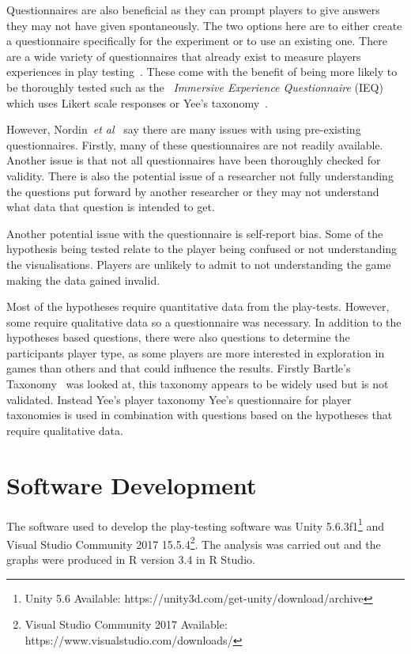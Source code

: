 \documentclass[journal]{IEEEtran}
\begin{document}
	Questionnaires are also beneficial as they can prompt players to give answers they may not have given spontaneously. The two options here are to either create a questionnaire specifically for the experiment or to use an existing one. There are a wide variety of questionnaires that already exist to measure players experiences in play testing~\cite{nordin2014, Jennett2008}. These come with the benefit of being more likely to be thoroughly tested such as the~\textit{ Immersive Experience Questionnaire} (IEQ) which uses Likert scale responses or Yee's taxonomy~\cite{nordin2014, Jennett2008, Yee2006, Yee2012}.
	
	However, Nordin~\textit{et al}~\cite{nordin2014} say there are many issues with using pre-existing questionnaires. Firstly, many of these questionnaires are not readily available. Another issue is that not all questionnaires have been thoroughly checked for validity. There is also the potential issue of a researcher not fully understanding the questions put forward by another researcher or they may not understand what data that question is intended to get.
	
	Another potential issue with the questionnaire is self-report bias. Some of the hypothesis being tested relate to the player being confused or not understanding the visualisations. Players are unlikely to admit to not understanding the game making the data gained invalid. 
	
	Most of the hypotheses require quantitative data from the play-tests. However, some require qualitative data so a questionnaire was necessary.  In addition to the hypotheses based questions, there were also questions to determine the participants player type, as some players are more interested in exploration in games than others and that could influence the results. 
	Firstly Bartle's Taxonomy~\cite{Bartle1996} was looked at, this taxonomy appears to be widely used but is not validated. Instead Yee's player taxonomy 
	Yee's questionnaire for player taxonomies is used in combination with questions based on the hypotheses that require qualitative data. 
	
	\section{Software Development} \label{softdev}
	The software used to develop the play-testing software was Unity 5.6.3f1\footnote[3]{Unity 5.6 Available: https://unity3d.com/get-unity/download/archive} and Visual Studio Community 2017  15.5.4\footnote[4]{Visual Studio Community 2017 Available: https://www.visualstudio.com/downloads/}.  The analysis was carried out and the graphs were produced in R version 3.4 in R Studio.
	
\end{document}
